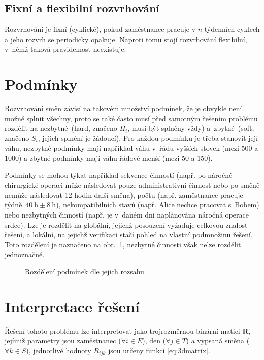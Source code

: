 \documentclass[twoside]{ctuthesis}
\begin{document}
\subsection{Fixní a flexibilní rozvrhování}
Rozvrhování je fixní (cyklické), pokud zaměstnanec pracuje v $n$-týdenních cyklech a jeho rozvrh se periodicky opakuje. Naproti tomu stojí rozvrhování flexibilní, v~němž taková pravidelnost neexistuje. \cite{burke2004state}


\section{Podmínky}
\label{sec:constraints}
Rozvrhování směn závisí na takovém množství podmínek, že je obvykle není možné splnit všechny, proto se také často musí před samotným řešením problému rozdělit na nezbytné~(hard, značeno $H_i$, musí být splněny vždy) a~zbytné~(soft, značeno $S_i$, jejich splnění je žádoucí). \cite{todorovic2012bee} Pro každou podmínku je třeba stanovit její váhu, nezbytné podmínky mají například váhu v~řádu vyšších stovek (mezi 500 a 1000) a zbytné podmínky mají váhu řádově menší (mezi 50 a 150). \cite{buyukozkan2014applicability}

Podmínky se mohou týkat například sekvence činností (např. po náročné chirurgické operaci může následovat pouze administrativní činnost nebo po směně nemůže následovat 12 hodin další směna), počtu (např. zaměstnanec pracuje týdně~$ 40~\mbox{h} \pm 8~\mbox{h}$), nekompatibilních stavů (např. Alice nechce pracovat s~Bobem) nebo nezbytných činností (např. je v~daném dni naplánována náročná operace srdce). Lze je rozdělit na globální, jejichž posouzení vyžaduje celkovou znalost řešení, a lokální, na jejichž verifikaci stačí pohled na vlastní podmnožinu řešení. Toto rozdělení je naznačeno na obr.~\ref{fig:constraints}, nezbytné činnosti však nelze rozdělit jednoznačně. \cite{blochliger2004modeling}

\begin{figure}[h]
	
	\caption{Rozdělení podmínek dle jejich rozsahu}
	\label{fig:constraints}
\end{figure}


\section{Interpretace řešení}
Řešení tohoto problému lze interpretovat jako trojrozměrnou binární matici $\boldsymbol{R}$, jejímiž parametry jsou zaměstnanec ($\forall i \in E$), den ($\forall j \in T$) a vypsaná směna ($\forall k \in S$), jednotlivé hodnoty $R_{ijk}$ jsou určeny funkcí \ref{eq:3dmatrix}. \cite{vaclavik2016roster}
\end{document}
